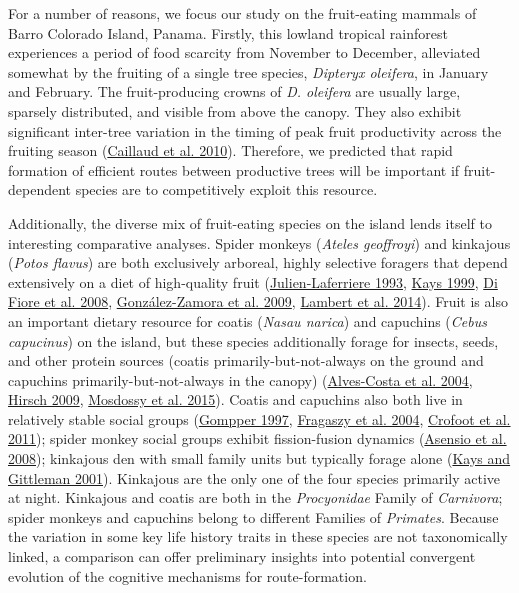 \documentclass[twoside,12pt,final]{ucthesis-CA2012}
\begin{document}
\begin{ucmainmatter}
For a number of reasons, we focus our study on the fruit-eating mammals of Barro Colorado Island, Panama. Firstly, this lowland tropical rainforest experiences a period of food scarcity from November to December, alleviated somewhat by the fruiting of a single tree species, \emph{Dipteryx oleifera}, in January and February. The fruit-producing crowns of \emph{D. oleifera} are usually large, sparsely distributed, and visible from above the canopy. They also exhibit significant inter-tree variation in the timing of peak fruit productivity across the fruiting season (\protect\hyperlink{ref-caillaud2010}{Caillaud et al. 2010}). Therefore, we predicted that rapid formation of efficient routes between productive trees will be important if fruit-dependent species are to competitively exploit this resource.

Additionally, the diverse mix of fruit-eating species on the island lends itself to interesting comparative analyses. Spider monkeys (\emph{Ateles geoffroyi}) and kinkajous (\emph{Potos flavus}) are both exclusively arboreal, highly selective foragers that depend extensively on a diet of high-quality fruit (\protect\hyperlink{ref-julien-laferriere1993}{Julien-Laferriere 1993}, \protect\hyperlink{ref-kays1999a}{Kays 1999}, \protect\hyperlink{ref-difiore2008}{Di Fiore et al. 2008}, \protect\hyperlink{ref-gonzalez-zamora2009}{González-Zamora et al. 2009}, \protect\hyperlink{ref-lambert2014}{Lambert et al. 2014}). Fruit is also an important dietary resource for coatis (\emph{Nasau narica}) and capuchins (\emph{Cebus capucinus}) on the island, but these species additionally forage for insects, seeds, and other protein sources (coatis primarily-but-not-always on the ground and capuchins primarily-but-not-always in the canopy) (\protect\hyperlink{ref-alves-costa2004}{Alves-Costa et al. 2004}, \protect\hyperlink{ref-hirsch2009}{Hirsch 2009}, \protect\hyperlink{ref-mosdossy2015}{Mosdossy et al. 2015}). Coatis and capuchins also both live in relatively stable social groups (\protect\hyperlink{ref-gompper1997}{Gompper 1997}, \protect\hyperlink{ref-fragaszy2004}{Fragaszy et al. 2004}, \protect\hyperlink{ref-crofoot2011}{Crofoot et al. 2011}); spider monkey social groups exhibit fission-fusion dynamics (\protect\hyperlink{ref-asensio2008}{Asensio et al. 2008}); kinkajous den with small family units but typically forage alone (\protect\hyperlink{ref-kays2001}{Kays and Gittleman 2001}). Kinkajous are the only one of the four species primarily active at night. Kinkajous and coatis are both in the \emph{Procyonidae} Family of \emph{Carnivora}; spider monkeys and capuchins belong to different Families of \emph{Primates}. Because the variation in some key life history traits in these species are not taxonomically linked, a comparison can offer preliminary insights into potential convergent evolution of the cognitive mechanisms for route-formation.


\end{ucmainmatter}
\end{document}
